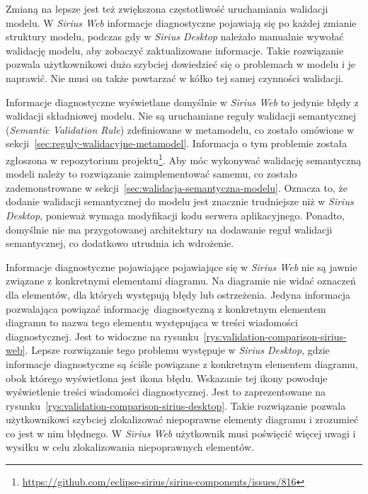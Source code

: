 Zmianą na lepsze jest też zwiększona częstotliwość uruchamiania walidacji
modelu. W \emph{Sirius Web} informacje diagnostyczne pojawiają się po każdej
zmianie struktury modelu, podczas gdy w \emph{Sirius Desktop} należało
manualnie wywołać walidację modelu, aby zobaczyć zaktualizowane informacje.
Takie rozwiązanie pozwala użytkownikowi dużo szybciej dowiedzieć się o
problemach w modelu i je naprawić. Nie musi on także powtarzać w kółko tej
samej czynności walidacji.

Informacje diagnostyczne wyświetlane domyślnie w \emph{Sirius Web} to jedynie
błędy z walidacji składniowej modelu. Nie są uruchamiane reguły walidacji
semantycznej (\emph{Semantic Validation Rule}) zdefiniowane w metamodelu, co
zostało omówione w sekcji~\ref{sec:reguly-walidacyjne-metamodel}. Informacja o
tym problemie została zgłoszona w repozytorium projektu\footnote{
	\url{https://github.com/eclipse-sirius/sirius-components/issues/816}}.
Aby móc wykonywać walidację semantyczną modeli należy to rozwiązanie
zaimplementować samemu, co zostało zademonstrowane w
sekcji~\ref{sec:walidacja-semantyczna-modelu}.
Oznacza to, że dodanie walidacji semantycznej do modelu jest znacznie
trudniejsze niż w \emph{Sirius Desktop}, ponieważ wymaga modyfikacji kodu
serwera aplikacyjnego. Ponadto, domyślnie nie ma przygotowanej architektury na
dodawanie reguł walidacji semantycznej, co dodatkowo utrudnia ich wdrożenie.

Informacje diagnostyczne pojawiające pojawiające się w \emph{Sirius Web} nie są
jawnie związane z konkretnymi elementami diagramu. Na diagramie nie widać
oznaczeń dla elementów, dla których występują błędy lub ostrzeżenia. Jedyna
informacja pozwalająca powiązać informację diagnostyczną z konkretnym elementem
diagramu to nazwa tego elementu występująca w treści wiadomości diagnostycznej.
Jest to widoczne na rysunku~\ref{rys:validation-comparison-sirius-web}. Lepsze
rozwiązanie tego problemu występuje w
\emph{Sirius Desktop}, gdzie informacje diagnostyczne są ściśle powiązane z
konkretnym elementem diagramu, obok którego wyświetlona jest ikona błędu.
Wskazanie tej ikony powoduje wyświetlenie treści wiadomości diagnostycznej.
Jest to zaprezentowane na
rysunku~\ref{rys:validation-comparison-sirius-desktop}.
Takie rozwiązanie pozwala użytkownikowi szybciej zlokalizować niepoprawne
elementy diagramu i zrozumieć co jest w nim błędnego. W \emph{Sirius Web}
użytkownik musi poświęcić więcej uwagi i wysiłku w celu zlokalizowania
niepoprawnych elementów.

